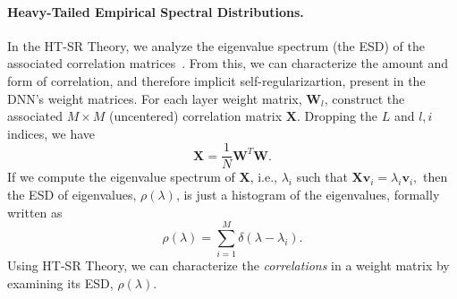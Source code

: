 \paragraph{Heavy-Tailed Empirical Spectral Distributions.}
%
%
In the HT-SR Theory, we analyze the eigenvalue spectrum (the ESD) of the associated correlation matrices~\cite{MM18_TR}.
From this, we can characterize the amount and form of correlation, and therefore implicit self-regularizartion, present in the DNN's weight matrices.
For each layer weight matrix, $\mathbf{W}_{l}$, construct the associated $M\times M$ (uncentered) correlation matrix $\mathbf{X}$. 
Dropping the $L$ and $l,i$ indices, we have
$$
\mathbf{X} = \frac{1}{N}\mathbf{W}^{T}\mathbf{W}.
$$
%
If we compute the eigenvalue spectrum of $\mathbf{X}$, i.e., $\lambda_i$ such that
$  %
\mathbf{X}\mathbf{v}_{i}=\lambda_{i}\mathbf{v}_{i} , 
$  %
then the ESD of eigenvalues, $\rho(\lambda)$, is just a histogram of the eigenvalues, formally written as
\begin{equation}
\rho(\lambda)=\sum\limits_{i=1}^{M}\delta(\lambda-\lambda_{i})  .
\label{eqn:eigenval_hist}
\end{equation}
%
Using HT-SR Theory, we can characterize the \emph{correlations} in a weight matrix by examining its ESD, $\rho(\lambda)$.
